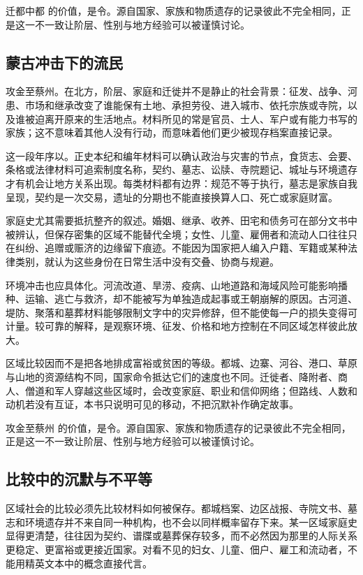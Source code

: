 迁都中都 的价值，是令。源自国家、家族和物质遗存的记录彼此不完全相同，正是这一不一致让阶层、性别与地方经验可以被谨慎讨论。

\subsection{蒙古冲击下的流民}

攻金至蔡州。在北方，阶层、家庭和迁徙并不是静止的社会背景：征发、战争、河患、市场和继承改变了谁能保有土地、承担劳役、进入城市、依托宗族或寺院，以及谁被迫离开原来的生活地点。材料所见的常是官员、士人、军户或有能力书写的家族；这不意味着其他人没有行动，而意味着他们更少被现存档案直接记录。

这一段年序以。正史本纪和编年材料可以确认政治与灾害的节点，食货志、会要、条格或法律材料可追索制度名称，契约、墓志、讼牍、寺院题记、城址与环境遗存才有机会让地方关系出现。每类材料都有边界：规范不等于执行，墓志是家族自我呈现，契约是一次交易，遗址的分期也不能直接换算人口、死亡或家庭财富。

家庭史尤其需要抵抗整齐的叙述。婚姻、继承、收养、田宅和债务可在部分文书中被辨认，但保存密集的区域不能替代全境；女性、儿童、雇佣者和流动人口往往只在纠纷、追赠或赈济的边缘留下痕迹。不能因为国家把人编入户籍、军籍或某种法律类别，就认为这些身份在日常生活中没有交叠、协商与规避。

环境冲击也应具体化。河流改道、旱涝、疫病、山地道路和海域风险可能影响播种、运输、逃亡与救济，却不能被写为单独造成起事或王朝崩解的原因。古河道、堤防、聚落和墓葬材料能够限制文字中的灾异修辞，但不能使每一户的损失变得可计量。较可靠的解释，是观察环境、征发、价格和地方控制在不同区域怎样彼此放大。

区域比较因而不是把各地排成富裕或贫困的等级。都城、边寨、河谷、港口、草原与山地的资源结构不同，国家命令抵达它们的速度也不同。迁徙者、降附者、商人、僧道和军人穿越这些区域时，会改变家庭、职业和信仰网络；但路线、人数和动机若没有互证，本书只说明可见的移动，不把沉默补作确定故事。

攻金至蔡州 的价值，是令。源自国家、家族和物质遗存的记录彼此不完全相同，正是这一不一致让阶层、性别与地方经验可以被谨慎讨论。

\subsection{比较中的沉默与不平等}

区域社会的比较必须先比较材料如何被保存。都城档案、边区战报、寺院文书、墓志和环境遗存并不来自同一种机构，也不会以同样概率留存下来。某一区域家庭史显得更清楚，往往因为契约、谱牒或墓葬保存较多，而不必然因为那里的人际关系更稳定、更富裕或更接近国家。对看不见的妇女、儿童、佃户、雇工和流动者，不能用精英文本中的概念直接代言。

